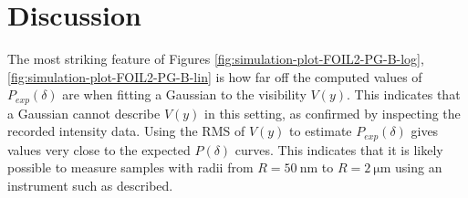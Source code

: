 \documentclass[]{article}
\begin{document}
	\section{Discussion}
	The most striking feature of Figures \ref{fig:simulation-plot-FOIL2-PG-B-log}, \ref{fig:simulation-plot-FOIL2-PG-B-lin} is how far off the computed values of $P_{exp}(\delta)$ are when fitting a Gaussian to the visibility $V(y)$. This indicates that a Gaussian cannot describe $V(y)$ in this setting, as confirmed by inspecting the recorded intensity data. Using the RMS of $V(y)$ to estimate $P_{exp}(\delta)$ gives values very close to the expected $P(\delta)$ curves. This indicates that it is likely possible to measure samples with radii from $R = \SI{50}{\nano\meter}$ to $R = \SI{2}{\micro\meter}$ using an instrument such as described. 
	
\end{document}
